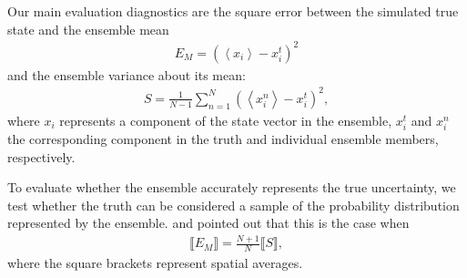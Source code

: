 Our main evaluation diagnostics are the square error between the simulated true state and the ensemble mean
\begin{eqnarray}
E_M = \left(
\left< x_i \right>-x_{i}^{t}
\right)^2
\end{eqnarray}
and the ensemble variance about its mean:
\begin{eqnarray}
S = 
\frac{1}{N-1}
\sum_{n=1}^N
\left(
	\left< x_{i}^{n} \right>-x_i^t
\right)^2,
\label{eq:spread}
\end{eqnarray}
where $x_{i}$ represents a component of the state vector in the ensemble,  $x_{i}^t$ and $x_{i}^n$ the corresponding component in the truth and individual ensemble members, respectively.

To evaluate whether the ensemble accurately represents the true uncertainty, we  test whether the truth can be considered a sample of the probability distribution represented by the ensemble.
 \citet{Huntley2009} and \citet{Murphy1988} pointed out that this is the case when 
\begin{eqnarray}
\llbracket E_M \rrbracket = \frac{N+1}{N} \llbracket S \rrbracket, 
\label{eq:EvsS}
\end{eqnarray}
where the square brackets represent spatial averages. 
 

